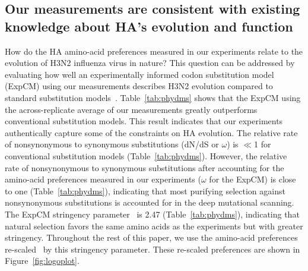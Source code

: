 \documentclass[9pt,twocolumn,twoside]{pnas-new-for-biorxiv}
\begin{document}
\subsection*{Our measurements are consistent with existing knowledge about HA's evolution and function}
How do the HA amino-acid preferences measured in our experiments relate to the evolution of H3N2 influenza virus in nature?
This question can be addressed by evaluating how well an experimentally informed codon substitution model (ExpCM) using our measurements describes H3N2 evolution compared to standard substitution models~\cite{bloom2017identification,hilton2017phydms}.
Table~\ref{tab:phydms} shows that the ExpCM using the across-replicate average of our measurements greatly outperforms conventional substitution models.
This result indicates that our experiments authentically capture some of the constraints on HA evolution.
The relative rate of nonsynonymous to synonymous substitutions (dN/dS or $\omega$) is $\ll$1 for conventional substitution models (Table~\ref{tab:phydms}).
However, the relative rate of nonsynonymous to synonymous substitutions after accounting for the amino-acid preferences measured in our experiments ($\omega$ for the ExpCM) is close to one (Table~\ref{tab:phydms}), indicating that most purifying selection against nonsynonymous substitutions is accounted for in the deep mutational scanning.
The ExpCM stringency parameter~\cite{hilton2017phydms} is 2.47 (Table~\ref{tab:phydms}), indicating that natural selection favors the same amino acids as the experiments but with greater stringency.
Throughout the rest of this paper, we use the amino-acid preferences re-scaled~\cite{bloom2017identification,hilton2017phydms} by this stringency parameter.
These re-scaled preferences are shown in Figure~\ref{fig:logoplot}.
\end{document}

